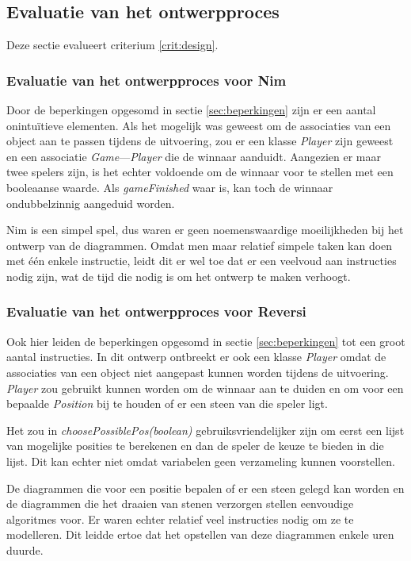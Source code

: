 \subsection{Evaluatie van het ontwerpproces}

Deze sectie evalueert criterium \ref{crit:design}.

\subsubsection{Evaluatie van het ontwerpproces voor Nim}

Door de beperkingen opgesomd in sectie \ref{sec:beperkingen} zijn er een aantal onintu\"itieve elementen. Als het mogelijk was geweest om de associaties van een object aan te passen tijdens de uitvoering, zou er een klasse \textit{Player} zijn geweest en een associatie \textit{Game}---\textit{Player} die de winnaar aanduidt. Aangezien er maar twee spelers zijn, is het echter voldoende om de winnaar voor te stellen met een booleaanse waarde. Als \textit{gameFinished} waar is, kan toch de winnaar ondubbelzinnig aangeduid worden.

Nim is een simpel spel, dus waren er geen noemenswaardige moeilijkheden bij het ontwerp van de diagrammen. Omdat men maar relatief simpele taken kan doen met \'e\'en enkele instructie, leidt dit er wel toe dat er een veelvoud aan instructies nodig zijn, wat de tijd die nodig is om het ontwerp te maken verhoogt.

\subsubsection{Evaluatie van het ontwerpproces voor Reversi}

Ook hier leiden de beperkingen opgesomd in sectie \ref{sec:beperkingen} tot een groot aantal instructies. In dit ontwerp ontbreekt er ook een klasse \textit{Player} omdat de associaties van een object niet aangepast kunnen worden tijdens de uitvoering. \textit{Player} zou gebruikt kunnen worden om de winnaar aan te duiden en om voor een bepaalde \textit{Position} bij te houden of er een steen van die speler ligt.

Het zou in \textit{choosePossiblePos(boolean)} gebruiksvriendelijker zijn om eerst een lijst van mogelijke posities te berekenen en dan de speler de keuze te bieden in die lijst. Dit kan echter niet omdat variabelen geen verzameling kunnen voorstellen.

De diagrammen die voor een positie bepalen of er een steen gelegd kan worden en de diagrammen die het draaien van stenen verzorgen stellen eenvoudige algoritmes voor. Er waren echter relatief veel instructies nodig om ze te modelleren. Dit leidde ertoe dat het opstellen van deze diagrammen enkele uren duurde.

